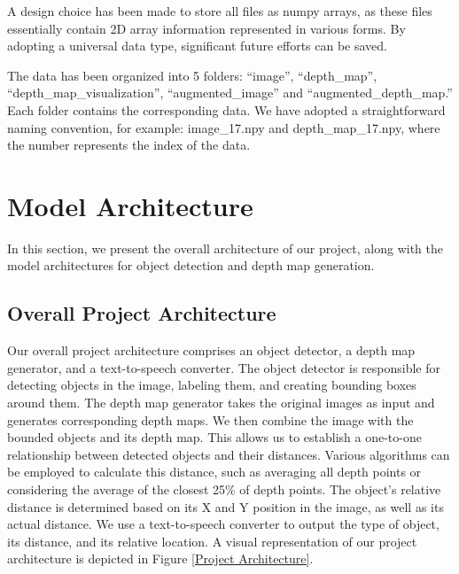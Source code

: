 \documentclass{article} %
\begin{document}
A design choice has been made to store all files as numpy arrays, as these files essentially contain 2D array information represented in various forms. By adopting a universal data type, significant future efforts can be saved.

The data has been organized into 5 folders: “image”, “depth\_map”, “depth\_map\_visualization”, “augmented\_image” and “augmented\_depth\_map.” Each folder contains the corresponding data. We have adopted a straightforward naming convention, for example: image\_17.npy and depth\_map\_17.npy, where the number represents the index of the data.





\section{Model Architecture}
In this section, we present the overall architecture of our project, along with the model architectures for object detection and depth map generation.

\subsection{Overall Project Architecture}
Our overall project architecture comprises an object detector, a depth map generator, and a text-to-speech converter. The object detector is responsible for detecting objects in the image, labeling them, and creating bounding boxes around them. The depth map generator takes the original images as input and generates corresponding depth maps. We then combine the image with the bounded objects and its depth map. This allows us to establish a one-to-one relationship between detected objects and their distances. Various algorithms can be employed to calculate this distance, such as averaging all depth points or considering the average of the closest 25\% of depth points. The object's relative distance is determined based on its X and Y position in the image, as well as its actual distance. We use a text-to-speech converter to output the type of object, its distance, and its relative location. A visual representation of our project architecture is depicted in Figure \ref{Project Architecture}.
\end{document}

